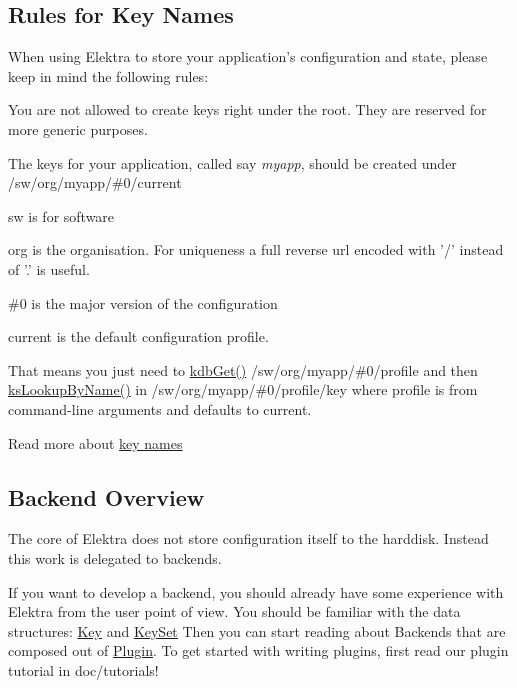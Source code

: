 \subsection*{Rules for Key Names}

When using Elektra to store your application's configuration and state, please keep in mind the following rules\+:
\begin{DoxyItemize}
\item You are not allowed to create keys right under the root. They are reserved for more generic purposes.
\item The keys for your application, called say {\itshape myapp}, should be created under {\ttfamily /sw/org/myapp/\#0/current}
\begin{DoxyItemize}
\item sw is for software
\item org is the organisation. For uniqueness a full reverse url encoded with '/' instead of '.' is useful.
\item {\ttfamily \#0} is the major version of the configuration
\item current is the default configuration profile.
\item That means you just need to \hyperlink{group__kdb_ga28e385fd9cb7ccfe0b2f1ed2f62453a1}{kdb\+Get()} {\ttfamily /sw/org/myapp/\#0/profile} and then \hyperlink{group__keyset_gad2e30fb6d4739d917c5abb2ac2f9c1a1}{ks\+Lookup\+By\+Name()} in {\ttfamily /sw/org/myapp/\#0/profile/key} where profile is from command-\/line arguments and defaults to current.
\end{DoxyItemize}
\end{DoxyItemize}

Read more about \hyperlink{md_doc_help_elektra-key-names_doc_help_elektra-key-names_md}{key names}

\subsection*{Backend Overview}

The core of Elektra does not store configuration itself to the harddisk. Instead this work is delegated to backends.

If you want to develop a backend, you should already have some experience with Elektra from the user point of view. You should be familiar with the data structures\+: \hyperlink{group__key}{Key} and \hyperlink{group__keyset}{Key\+Set} Then you can start reading about Backends that are composed out of \hyperlink{group__plugin}{Plugin}. To get started with writing plugins, first read our plugin tutorial in doc/tutorials!

